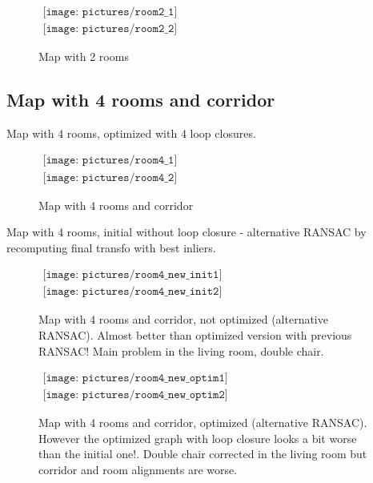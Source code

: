\begin{figure}[h!]
\centering$
\begin{array}{c}
\texttt{[image: pictures/room2\_1]}\\
\texttt{[image: pictures/room2\_2]}
\end{array}$
\caption{Map with 2 rooms}
\end{figure}

\clearpage

\subsection{Map with 4 rooms and corridor}
Map with 4 rooms, optimized with 4 loop closures.

\begin{figure}[h]
\centering$
\begin{array}{c}
\texttt{[image: pictures/room4\_1]}\\
\texttt{[image: pictures/room4\_2]}
\end{array}$
\caption{Map with 4 rooms and corridor}
\end{figure}

\clearpage

Map with 4 rooms, initial without loop closure - alternative RANSAC by recomputing final transfo with best inliers.

\begin{figure}[h]
\centering$
\begin{array}{c}
\texttt{[image: pictures/room4\_new\_init1]}\\
\texttt{[image: pictures/room4\_new\_init2]}
\end{array}$
\caption{Map with 4 rooms and corridor, not optimized (alternative RANSAC). Almost better than optimized version with previous RANSAC! Main problem in the living room, double chair.}
\end{figure}

\clearpage

\begin{figure}[h]
\centering$
\begin{array}{c}
\texttt{[image: pictures/room4\_new\_optim1]}\\
\texttt{[image: pictures/room4\_new\_optim2]}
\end{array}$
\caption{Map with 4 rooms and corridor, optimized (alternative RANSAC). However the optimized graph with loop closure looks a bit worse than the initial one!. Double chair corrected in the living room but corridor and room alignments are worse.}
\end{figure}

